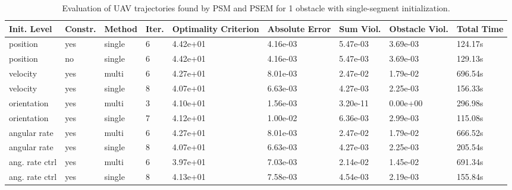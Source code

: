 \begin{table}
\small

\caption{Evaluation of UAV trajectories found by PSM and PSEM for 1 obstacle with single-segment initialization.}
\label{tab:traj-plan-eval-simple-single}
\begin{tabular}{p{21mm}p{9mm}p{12mm}p{6mm}p{14mm}p{14mm}p{14mm}p{14mm}p{14mm}}
\toprule
Init. Level & Constr. & Method & Iter. & Optimality Criterion & Absolute Error & Sum Viol. & Obstacle Viol. & Total Time \\
\midrule
position & yes & single & 6 & \cellcolor{color8} 4.42e+01 & 4.16e-03 & 5.47e-03 & 3.69e-03 & 124.17s \\
position & no & single & 6 & \cellcolor{color8} 4.42e+01 & 4.16e-03 & 5.47e-03 & 3.69e-03 & 129.13s \\
velocity & yes & multi & 6 & 4.27e+01 & 8.01e-03 & \cellcolor{color8} 2.47e-02 & \cellcolor{color8} 1.79e-02 & \cellcolor{color8} 696.54s \\
velocity & yes & single & \cellcolor{color8} 8 & 4.07e+01 & 6.63e-03 & 4.27e-03 & 2.25e-03 & 156.33s \\
orientation & yes & multi & \cellcolor{color3} 3 & 4.10e+01 & \cellcolor{color3} 1.56e-03 & \cellcolor{color3} 3.20e-11 & \cellcolor{color3} 0.00e+00 & 296.98s \\
orientation & yes & single & 7 & 4.12e+01 & \cellcolor{color8} 1.00e-02 & 6.36e-03 & 2.99e-03 & \cellcolor{color3} 115.08s \\
angular rate & yes & multi & 6 & 4.27e+01 & 8.01e-03 & \cellcolor{color8} 2.47e-02 & \cellcolor{color8} 1.79e-02 & 666.52s \\
angular rate & yes & single & \cellcolor{color8} 8 & 4.07e+01 & 6.63e-03 & 4.27e-03 & 2.25e-03 & 205.54s \\
ang. rate ctrl & yes & multi & 6 & \cellcolor{color3} 3.97e+01 & 7.03e-03 & 2.14e-02 & 1.45e-02 & 691.34s \\
ang. rate ctrl & yes & single & \cellcolor{color8} 8 & 4.13e+01 & 7.58e-03 & 4.54e-03 & 2.19e-03 & 155.84s \\
\bottomrule
\end{tabular}
\end{table}
